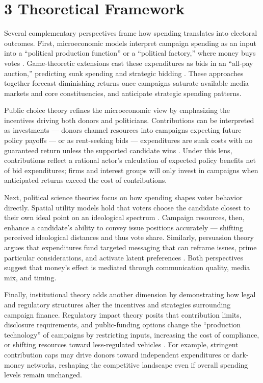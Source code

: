 \section*{3 Theoretical Framework}

\indent Several complementary perspectives frame how spending translates into electoral outcomes. First, microeconomic models interpret campaign spending as an input into a ``political production function'' or a ``political factory,'' where money buys votes \cite{jacobson1983}. Game-theoretic extensions cast these expenditures as bids in an ``all-pay auction,'' predicting sunk spending and strategic bidding \cite{Levin2004}. These approaches together forecast diminishing returns once campaigns saturate available media markets and core constituencies, and anticipate strategic spending patterns.

\indent Public choice theory refines the microeconomic view by emphasizing the incentives driving both donors and politicians. Contributions can be interpreted as investments --- donors channel resources into campaigns expecting future policy payoffs --- or as rent-seeking bids --- expenditures are sunk costs with no guaranteed return unless the supported candidate wins \cite{becker1983}. Under this lens, contributions reflect a rational actor's calculation of expected policy benefits net of bid expenditures; firms and interest groups will only invest in campaigns when anticipated returns exceed the cost of contributions. 

\indent Next, political science theories focus on how spending shapes voter behavior directly. Spatial utility models hold that voters choose the candidate closest to their own ideal point on an ideological spectrum \cite{downs2024}. Campaign resources, then, enhance a candidate's ability to convey issue positions accurately --- shifting perceived ideological distances and thus vote share. Similarly, persuasion theory argues that expenditures fund targeted messaging that can reframe issues, prime particular considerations, and activate latent preferences \cite{lupia2021}. Both perspectives suggest that money's effect is mediated through communication quality, media mix, and timing. 

\indent Finally, institutional theory adds another dimension by demonstrating how legal and regulatory structures alter the incentives and strategies surrounding campaign finance. Regulatory impact theory posits that contribution limits, disclosure requirements, and public-funding options change the ``production technology'' of campaigns by restricting inputs, increasing the cost of compliance, or shifting resources toward less-regulated vehicles \cite{stratmann2005}. For example, stringent contribution caps may drive donors toward independent expenditures or dark-money networks, reshaping the competitive landscape even if overall spending levels remain unchanged.

